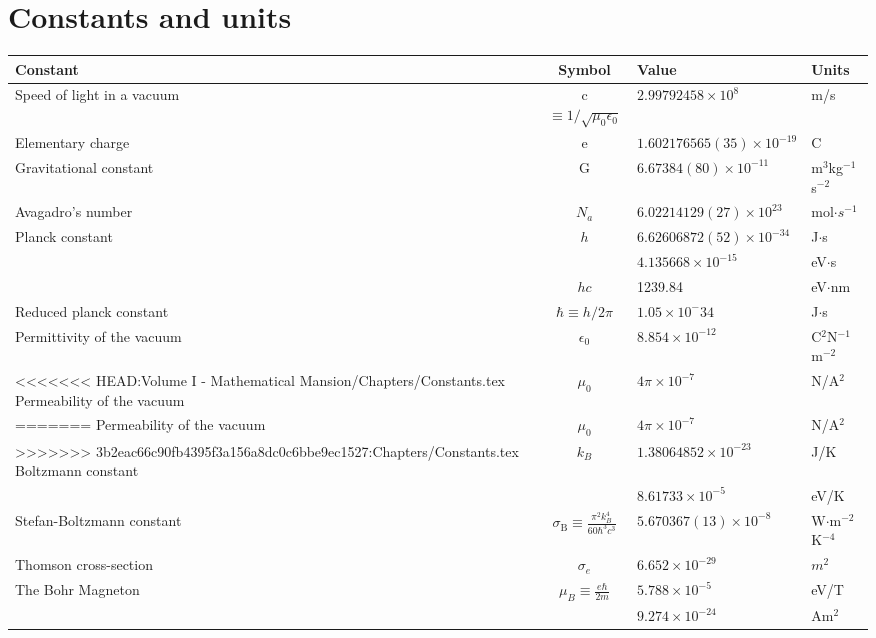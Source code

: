 \chapter{Constants and units}
\thispagestyle{fancy}
\begin{fancybox}{}	
\begin{center}
	\begin{tabular}{   l  |  c  |  l  |  l  }
		Constant & Symbol & Value & Units \\
		\hline
		Speed of light in a vacuum& c $\equiv 1/\sqrt{\mu_0\epsilon_0}$ & $2.99792458 \times 10^8$ & m/s \\
		Elementary charge& e & $1.602176565(35)\times 10^{-19}$ & C\\
		Gravitational constant& G & $6.67384(80)\times 10^{-11}$ & m$^3$kg$^{-1}$s$^{-2}$\\
		Avagadro's number& $N_a$ & $6.02214129(27)\times 10^{23}$ & mol$\cdot s^{-1}$\\
		Planck constant & $h$ & $ 6.62606872(52) \times 10^{-34}$ & J$\cdot$s \\
		& & $4.135668 \times 10^{-15}$ & eV$\cdot$s \\
		& $hc$ & 1239.84 & eV$\cdot$nm \\
		Reduced planck constant& $\hbar \equiv h/2\pi$ & $1.05\times 10^-{34}$ & J$\cdot$s\\
		Permittivity of the vacuum & $\epsilon_0$ & $8.854\times 10^{-12}$ & C$^2$N$^{-1}$m$^{-2}$ \\
<<<<<<< HEAD:Volume I -  
Mathematical Mansion/Chapters/Constants.tex
		Permeability of the vacuum & $\mu_0$ & $4\pi\times 10^{-7}$ & N/A$^{2}$ \\
=======
		Permeability of the vacuum & $\mu_0$ & $4\pi\times 10^{-7}$ & N/A$^2$ \\
>>>>>>> 3b2eac66c90fb4395f3a156a8dc0c6bbe9ec1527:Chapters/Constants.tex
		Boltzmann constant & $k_B$ & $1.38064852\times 10^{-23}$ & J/K \\
				 & & $8.61733\times 10^{-5}$ & eV/K \\
		Stefan-Boltzmann constant & $\sigma_{\textrm{B}} \equiv \frac{\pi^2k_B^4}{60\hbar^3c^3}$ & $5.670367(13)\times 10^{-8}$ & W$\cdot$m$^{-2}$K$^{-4}$ \\
		Thomson cross-section & $\sigma_e$ & $6.652\times10^{-29}$ & $m^2$ \\
		The Bohr Magneton & $\mu_B \equiv \frac{e\hbar}{2m}$ & $5.788\times 10^{-5}$ & eV/T \\
		& & $9.274\times 10^{-24}$ & Am$^2$ \\

\end{tabular}
\end{center}
\end{fancybox}
